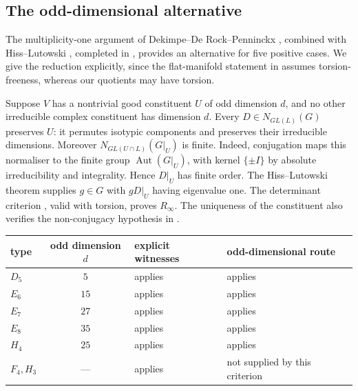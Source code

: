 \documentclass[11pt]{article}
\theoremstyle{definition}
\newcommand{\Aut}{\operatorname{Aut}}
\newcommand{\Rinf}{R_\infty}
\begin{document}
\subsection{The odd-dimensional alternative}\label{sec:alternative}

The multiplicity-one argument of Dekimpe--De Rock--Penninckx \cite[Thm.~4.7]{DDP09}, combined with
Hiss--Lutowski \cite[Def.~1.1.3, Thm.~1.1.5]{HL25}, completed in \cite{HL26}, provides an alternative for five positive cases. We give the reduction
explicitly, since the flat-manifold statement in \cite{DDP09} assumes torsion-freeness, whereas our quotients
may have torsion.

Suppose $V$ has a nontrivial good constituent $U$ of odd dimension $d$, and no other irreducible complex
constituent has dimension $d$. Every $D\in N_{GL(L)}(G)$ preserves $U$: it permutes isotypic components
and preserves their irreducible dimensions. Moreover
$N_{GL(U\cap L)}(G|_U)$ is finite. Indeed, conjugation maps this normaliser to the finite group
$\Aut(G|_U)$, with kernel $\{\pm I\}$ by absolute irreducibility and integrality. Hence $D|_U$ has finite
order. The Hiss--Lutowski theorem supplies $g\in G$ with $gD|_U$ having eigenvalue one. The determinant
criterion \cite[Thm.~3.3]{DKT19}, valid with torsion, proves $\Rinf$. The uniqueness of the constituent also
verifies the non-conjugacy hypothesis in \cite[Thm.~4.7]{DDP09}.

\begin{center}\small
\begin{tabular}{lcll}
\toprule
type & odd dimension $d$ & explicit witnesses & odd-dimensional route\\
\midrule
$D_5$ & $5$ & applies & applies\\
$E_6$ & $15$ & applies & applies\\
$E_7$ & $27$ & applies & applies\\
$E_8$ & $35$ & applies & applies\\
$H_4$ & $25$ & applies & applies\\
$F_4,H_3$ & --- & applies & not supplied by this criterion\\
\bottomrule
\end{tabular}
\end{center}
\end{document}

